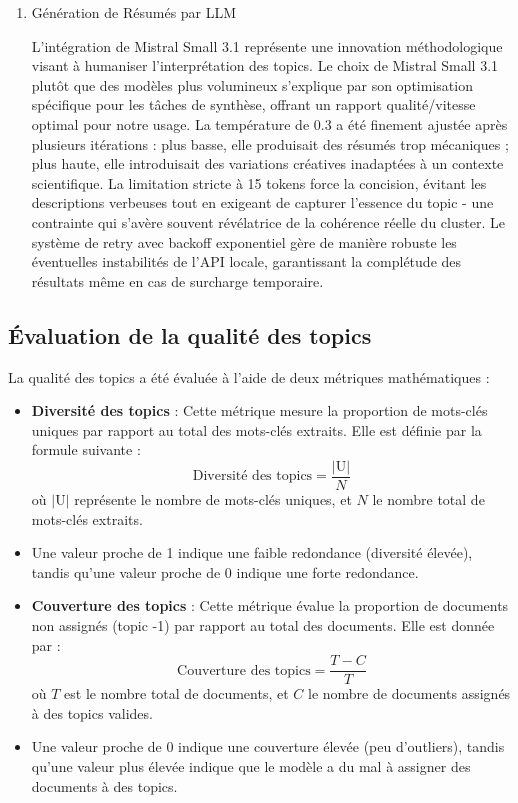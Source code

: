 \documentclass[mstat,12pt]{unswthesis}
\begin{document}
\begin{enumerate}
\begin{enumerate}
    \end{enumerate}

    \bigskip

    \item Génération de Résumés par LLM

    \bigskip

    L'intégration de Mistral Small 3.1 représente une innovation méthodologique visant à humaniser l'interprétation des topics. Le choix de Mistral Small 3.1 plutôt que des modèles plus volumineux s'explique par son optimisation spécifique pour les tâches de synthèse, offrant un rapport qualité/vitesse optimal pour notre usage. La température de 0.3 a été finement ajustée après plusieurs itérations : plus basse, elle produisait des résumés trop mécaniques ; plus haute, elle introduisait des variations créatives inadaptées à un contexte scientifique. La limitation stricte à 15 tokens force la concision, évitant les descriptions verbeuses tout en exigeant de capturer l'essence du topic - une contrainte qui s'avère souvent révélatrice de la cohérence réelle du cluster. Le système de retry avec backoff exponentiel gère de manière robuste les éventuelles instabilités de l'API locale, garantissant la complétude des résultats même en cas de surcharge temporaire.
\end{enumerate}

\bigskip

\subsection{Évaluation de la qualité des topics}


La qualité des topics a été évaluée à l'aide de deux métriques mathématiques :
\begin{itemize}
 \item \textbf{Diversité des topics} : Cette métrique mesure la proportion de mots-clés
uniques par rapport au total des mots-clés extraits. Elle est définie par la formule suivante :
 \[
 \text{Diversité des topics} = \frac{|\text{U}|}{N}
 \]
 où \( |\text{U}| \) représente le nombre de mots-clés uniques, et \( N \) le nombre total
de mots-clés extraits.
\item Une valeur proche de 1 indique une faible redondance (diversité élevée), tandis
qu'une valeur proche de 0 indique une forte redondance.
 \item \textbf{Couverture des topics} : Cette métrique évalue la proportion de documents
non assignés (topic -1) par rapport au total des documents. Elle est donnée par :
 \[
 \text{Couverture des topics} = \frac{T - C}{T}
 \]
 où \( T \) est le nombre total de documents, et \( C \) le nombre de documents assignés à
des topics valides.
\item Une valeur proche de 0 indique une couverture élevée (peu d'outliers), tandis qu'une
valeur plus élevée indique que le modèle a du mal à assigner des documents à des topics.
\end{itemize}
\end{document}
